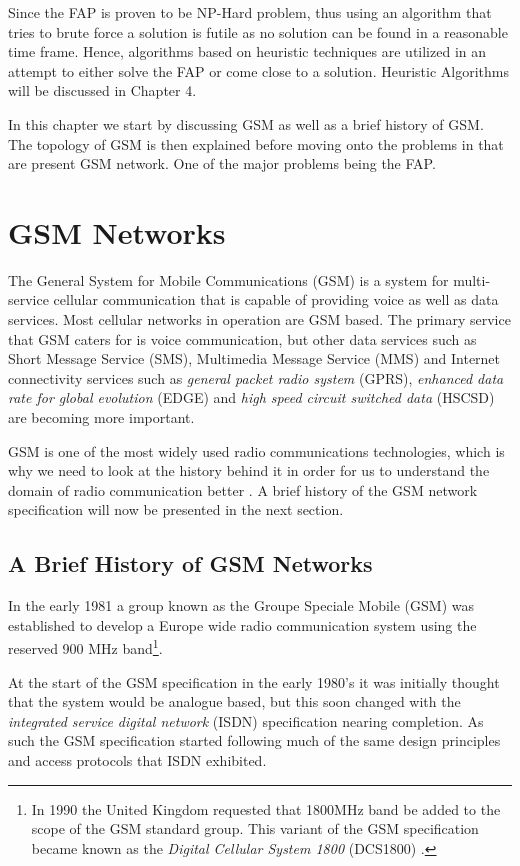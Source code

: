 Since the FAP is proven to be NP-Hard problem, thus using an algorithm that tries to brute force a solution is futile as no solution can be found in a reasonable time frame. Hence, algorithms based on heuristic techniques are utilized in an attempt to either solve the FAP or come close to a solution. Heuristic Algorithms will be discussed in Chapter 4.

In this chapter we start by discussing GSM as well as a brief history of GSM. The topology of GSM is then explained before moving onto the problems in that are present GSM network. One of the major problems being the FAP.

\section{GSM Networks}
The General System for Mobile Communications (GSM) is a system for multi-service cellular communication that is capable of providing voice as well as data services. Most cellular networks in operation 
are GSM based. The primary service that GSM caters for is voice communication, but other data services such as Short Message Service (SMS), Multimedia Message Service (MMS) and Internet 
connectivity services such as \emph{general packet radio system} (GPRS), \emph{enhanced data rate for global evolution} (EDGE) and \emph{high speed circuit switched data} (HSCSD) are becoming more important\cite{GSMArchitectureProtocolsServices,Eisenblatter}.

GSM is one of the most widely used radio communications technologies, which is why we need to look at the history behind it in order for us to understand the domain of radio communication better \cite{GSMArchitectureProtocolsServices}. A brief history of the GSM network specification will now be presented in the next section.

\subsection{A Brief History of GSM Networks}
\label{sec:gsmhistory}
In the early 1981 a group known as the Groupe Speciale Mobile (GSM) was established to develop a Europe wide radio communication system using the reserved 900 MHz band\footnote{In 1990 the United Kingdom requested that 1800MHz band be added to the scope of the GSM standard group. This variant of the GSM specification became known as the \emph{Digital Cellular System 1800} (DCS1800) \cite{GSM92}.}.

At the start of the GSM specification in the early 1980's it was initially thought that the system would be analogue based, but this soon changed with the \emph{integrated service digital network} (ISDN) specification nearing completion. As such the GSM specification started following much of the same design principles and access protocols that ISDN exhibited.


